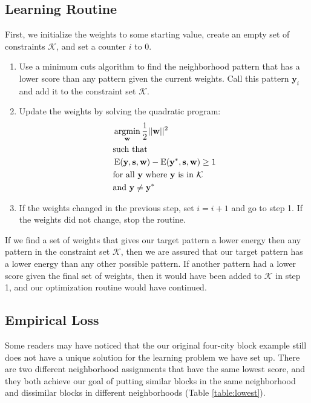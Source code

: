 \subsection*{Learning Routine}
First, we initialize the weights to some starting value, create an
empty set of constraints $\mathcal{K}$, and set a counter $i$ to $0$.
\begin{enumerate}
\item Use a minimum cuts algorithm to find the neighborhood pattern
  that has a lower score than any pattern given the current weights.
  Call this pattern $\mathbf{y}_i$ and add it to the constraint
  set $\mathcal{K}$.

\item Update the weights by solving the quadratic program: 
%
\begin{align*}
&\operatorname*{\arg\!\min}_{\mathbf{w}} \frac{1}{2}||\mathbf{w}||^2 \\
&\text{such that} \\
&\operatorname{E}(\mathbf{y}, \mathbf{s}, \mathbf{w})
- \operatorname{E}(\mathbf{y}^*, \mathbf{s}, \mathbf{w}) \geq 1 \\ 
&\text{for all } \mathbf{y} \text{ where } \mathbf{y} \text{ is in } \mathcal{K}\\
&\text{and } \mathbf{y} \neq \mathbf{y}^*
\end{align*}
%

\item If the weights changed in the previous step, set $i = i + 1$ and
  go to step 1. If the weights did not change, stop the routine.
\end{enumerate}

If we find a set of weights that gives our target pattern a lower
energy then any pattern in the constraint set $\mathcal{K}$, then we
are assured that our target pattern has a lower energy than any other
possible pattern. If another pattern had a lower score given the final
set of weights, then it would have been added to $\mathcal{K}$ in step
1, and our optimization routine would have continued. 

\subsection*{Empirical Loss}
Some readers may have noticed that the our original four-city block example
still does not have a unique solution for the learning problem we have
set up. There are two different neighborhood assignments that have the
same lowest score, and they both achieve our goal of putting similar
blocks in the same neighborhood and dissimilar blocks in different
neighborhoods (Table \ref{table:lowest}).

